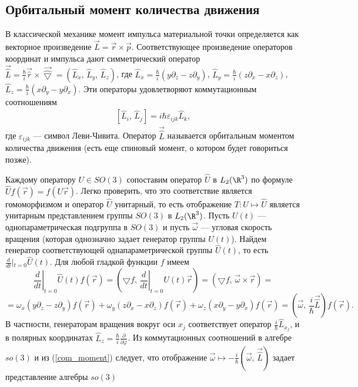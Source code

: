 \documentclass[a4paper
]{article}
\begin{document}
\subsection{Орбитальный момент количества движения}
В классической механике момент импульса материальной точки определяется
как векторное произведение $\vec{L}=\vec{r}\times\vec{p}$. Соответствующее
произведение операторов координат и импульса дают симметрический
оператор $\vec{\hat{L}}=\frac{\hbar}{i}\vec{\hat{r}}\times \vec{\hat{
\bigtriangledown}}=(\hat L_x, \, \hat L_y, \, \hat L_z)$, где
$\hat L_x=\frac{\hbar}{i}(y\partial_z-z\partial_y)$, $\hat L_y=\frac{\hbar}
{i}(z\partial_x-x\partial_z)$, $\hat L_z=\frac{\hbar}{i}(x\partial_y-y
\partial_x)$. Эти операторы удовлетворяют коммутационным соотношениям
\begin{align}
\label{com_moment}
[\hat L_i, \, \hat L_j]=i\hbar\varepsilon_{ijk}\hat L_k,
\end{align}
где $\varepsilon_{ijk}$ --- символ Леви-Чивита. Оператор $\vec{\hat{L}}$
называется орбитальным моментом количества движения (есть еще
спиновый момент, о котором будет говориться позже). \par
Каждому оператору $U\in SO(3)$ сопоставим оператор $\hat{U}$ в $L_2(\R^3)$
по формуле $\hat Uf(\vec{r})=f(U\vec{r})$. Легко проверить, что это
соответствие является гомоморфизмом и оператор $\hat{U}$ унитарный, то
есть отображение $T:U\mapsto \hat{U}$ является унитарным представлением
группы $SO(3)$ в $L_2(\R^3)$. Пусть $U(t)$ --- однопараметрическая
подгруппа в $SO(3)$ и пусть $\vec{\omega}$ --- угловая скорость вращения
(которая однозначно задает генератор группы $U(t)$).
Найдем генератор соответствующей однапараметрической группы $\hat{U}(t)$,
то есть $\frac{d}{dt}\left|_{t=0}\right.\hat U(t)$. Для любой гладкой
функции $f$ имеем
$$\left.\frac{d}{dt}\right|_{t=0}\hat U(t)f(\vec{r})=\left(\bigtriangledown
f,\, \left.\frac{d}{dt}\right|_{t=0}U(t)\vec{r}\right)=\left(
\bigtriangledown f,\, \vec{\omega}\times\vec{r}\right)=$$
$$=\omega_x(y\partial_z-z\partial_y)f(\vec{r})+\omega_y(z\partial_x-
x\partial_z)f(\vec{r})+\omega_z(x\partial_y-y\partial_x)f(\vec{r})
=\left(\vec{\omega}, \, \frac{i}{\hbar}\vec{\hat{L}}\right)f(\vec{r}).$$
В частности, генераторам вращения вокруг оси $x_j$
соответствует оператор $\frac{i}{\hbar}\hat L_{x_j}$, и в полярных
координатах $\hat L_z=\frac{\hbar}{i}\frac{\partial}{\partial \varphi}$.
Из коммутационных соотношений в алгебре $so(3)$ и из (\ref{com_moment})
следует, что отображение $\vec{\omega}\mapsto -\frac{i}{\hbar}
(\vec{\omega}, \, \vec{\hat{L}})$ задает представление алгебры $so(3)$
\end{document}
